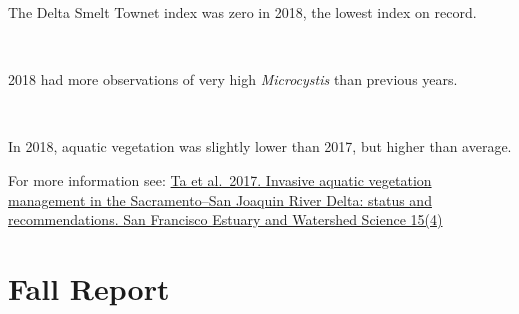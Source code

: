 \documentclass[
]{book}
\begin{document}
\begin{panel-grid}
\begin{columns-nocenter}
\begin{column800}
\begin{expand}
\end{expand}

\end{column800}

\end{columns-nocenter}

\begin{columns-nocenter}

\begin{column800}

The Delta Smelt Townet index was zero in 2018, the lowest index on record.

\end{column800}

\begin{column40}

~

\end{column40}

\begin{column800}

2018 had more observations of very high \emph{Microcystis} than previous years.

\end{column800}

\begin{column40}

~

\end{column40}

\begin{column800}

In 2018, aquatic vegetation was slightly lower than 2017, but higher than average.

\end{column800}

\end{columns-nocenter}

\end{panel-grid}

\begin{disclaimer}
For more information see:
\href{https://escholarship.org/uc/item/828355w6}{Ta et al.~2017.
Invasive aquatic vegetation management in the Sacramento--San Joaquin
River Delta: status and recommendations. San Francisco Estuary and
Watershed Science 15(4)}
\end{disclaimer}

\hypertarget{Fall}{%
\chapter{Fall Report}\label{Fall}}
\end{document}
